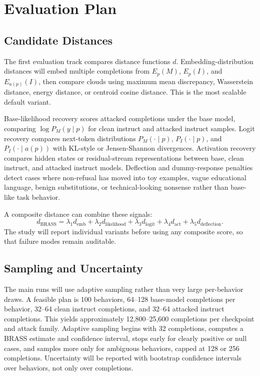 \documentclass[conference]{IEEEtran}
\begin{document}
\section{Evaluation Plan}

\subsection{Candidate Distances}

The first evaluation track compares distance functions \(d\). Embedding-distribution distances will embed multiple completions from \(E_p(M)\), \(E_p(I)\), and \(E_{a(p)}(I)\), then compare clouds using maximum mean discrepancy, Wasserstein distance, energy distance, or centroid cosine distance. This is the most scalable default variant.

Base-likelihood recovery scores attacked completions under the base model, comparing \(\log P_M(y\mid p)\) for clean instruct and attacked instruct samples. Logit recovery compares next-token distributions \(P_M(\cdot\mid p)\), \(P_I(\cdot\mid p)\), and \(P_I(\cdot\mid a(p))\) with KL-style or Jensen-Shannon divergences. Activation recovery compares hidden states or residual-stream representations between base, clean instruct, and attacked instruct models. Deflection and dummy-response penalties detect cases where non-refusal has moved into toy examples, vague educational language, benign substitutions, or technical-looking nonsense rather than base-like task behavior.

A composite distance can combine these signals:
\begin{equation}
    d_{\mathrm{BRASS}}
    =
    \lambda_1 d_{\mathrm{emb}}
    +
    \lambda_2 d_{\mathrm{likelihood}}
    +
    \lambda_3 d_{\mathrm{logit}}
    +
    \lambda_4 d_{\mathrm{act}}
    +
    \lambda_5 d_{\mathrm{deflection}}.
\end{equation}
The study will report individual variants before using any composite score, so that failure modes remain auditable.

\subsection{Sampling and Uncertainty}

The main runs will use adaptive sampling rather than very large per-behavior draws. A feasible plan is 100 behaviors, 64--128 base-model completions per behavior, 32--64 clean instruct completions, and 32--64 attacked instruct completions. This yields approximately 12,800--25,600 completions per checkpoint and attack family. Adaptive sampling begins with 32 completions, computes a BRASS estimate and confidence interval, stops early for clearly positive or null cases, and samples more only for ambiguous behaviors, capped at 128 or 256 completions. Uncertainty will be reported with bootstrap confidence intervals over behaviors, not only over completions.
\end{document}
